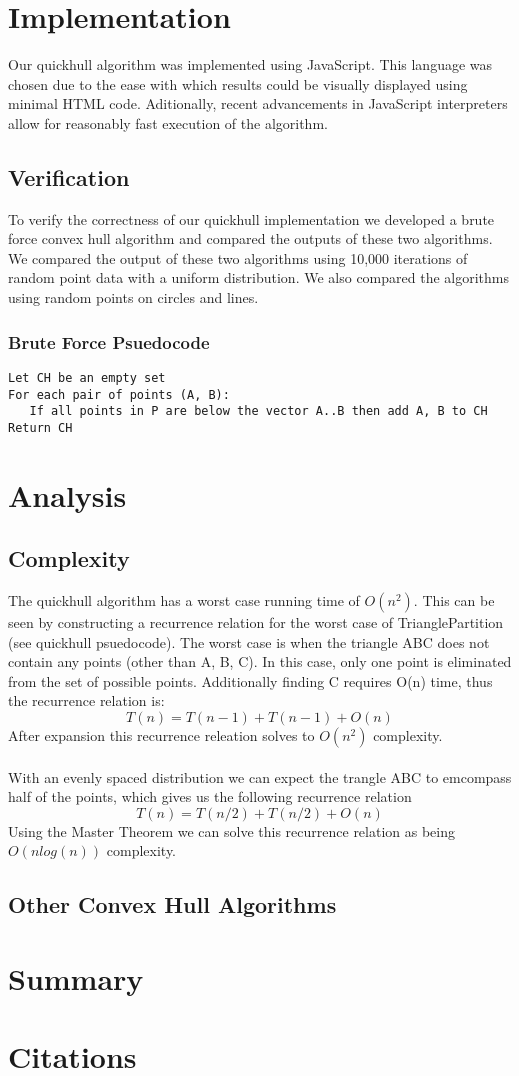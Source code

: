 \documentclass[11pt]{article}
\begin{document}
\section{Implementation}
Our quickhull algorithm was implemented using JavaScript. This language was chosen due to the ease with which results could be visually displayed using minimal HTML code. Aditionally, recent advancements in JavaScript interpreters allow for reasonably fast execution of the algorithm.

\subsection{Verification}
To verify the correctness of our quickhull implementation we developed a brute force convex hull algorithm and compared the outputs of these two algorithms. We compared the output of these two algorithms using 10,000 iterations of random point data with a uniform distribution. We also compared the algorithms using random points on circles and lines.

\subsubsection{Brute Force Psuedocode}
\begin{verbatim}
Let CH be an empty set
For each pair of points (A, B):
   If all points in P are below the vector A..B then add A, B to CH
Return CH
\end{verbatim}

\section{Analysis}

\subsection{Complexity}
The quickhull algorithm has a worst case running time of $O(n^2)$. This can be seen by constructing a recurrence relation for the worst case of TrianglePartition (see quickhull psuedocode). The worst case is when the triangle ABC does not contain any points (other than A, B, C). In this case, only one point is eliminated from the set of possible points. Additionally finding C requires O(n) time, thus the recurrence relation is:
\[ T(n) = T(n - 1) + T(n - 1) + O(n) \]
After expansion this recurrence releation solves to $O(n^2)$ complexity.
\\
\\
With an evenly spaced distribution we can expect the trangle ABC to emcompass half of the points, which gives us the following recurrence relation
\[ T(n) = T(n / 2) + T(n / 2) + O(n) \]
Using the Master Theorem we can solve this recurrence relation as being $O(n log(n))$ complexity.

\subsection{Other Convex Hull Algorithms}

\section{Summary}

\section{Citations}
\end{document}
